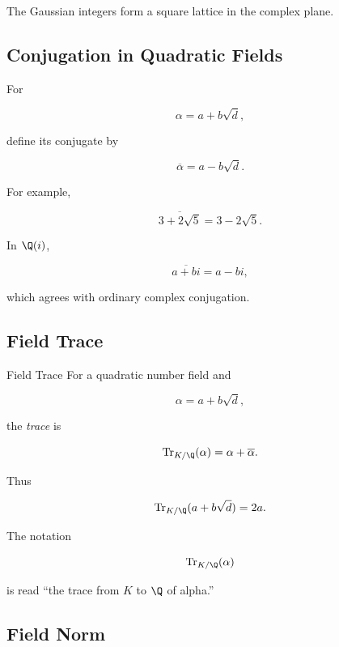 The Gaussian integers form a square lattice in the complex plane.

\subsection{Conjugation in Quadratic Fields}
\label{subsec:quadratic-conjugation}

For

\[ \alpha=a+b\sqrt d, \]

define its conjugate by

\[ \overline{\alpha}=a-b\sqrt d. \]

For example,

\[ \overline{3+2\sqrt5}=3-2\sqrt5. \]

In \(\Q(i)\),

\[ \overline{a+bi}=a-bi, \]

which agrees with ordinary complex conjugation.

\subsection{Field Trace}
\label{subsec:field-trace-number-theory}

\begin{definitionbox}{Field Trace}
For a quadratic number field and

\[ \alpha=a+b\sqrt d, \]

the \emph{trace} is

\[ \operatorname{Tr}_{K/\Q}(\alpha)=\alpha+\overline{\alpha}. \]
\end{definitionbox}

Thus

\[ \operatorname{Tr}_{K/\Q}(a+b\sqrt d)=2a. \]

The notation

\[ \operatorname{Tr}_{K/\Q}(\alpha) \]

is read ``the trace from \(K\) to \(\Q\) of alpha.''

\subsection{Field Norm}
\label{subsec:field-norm-number-theory}


